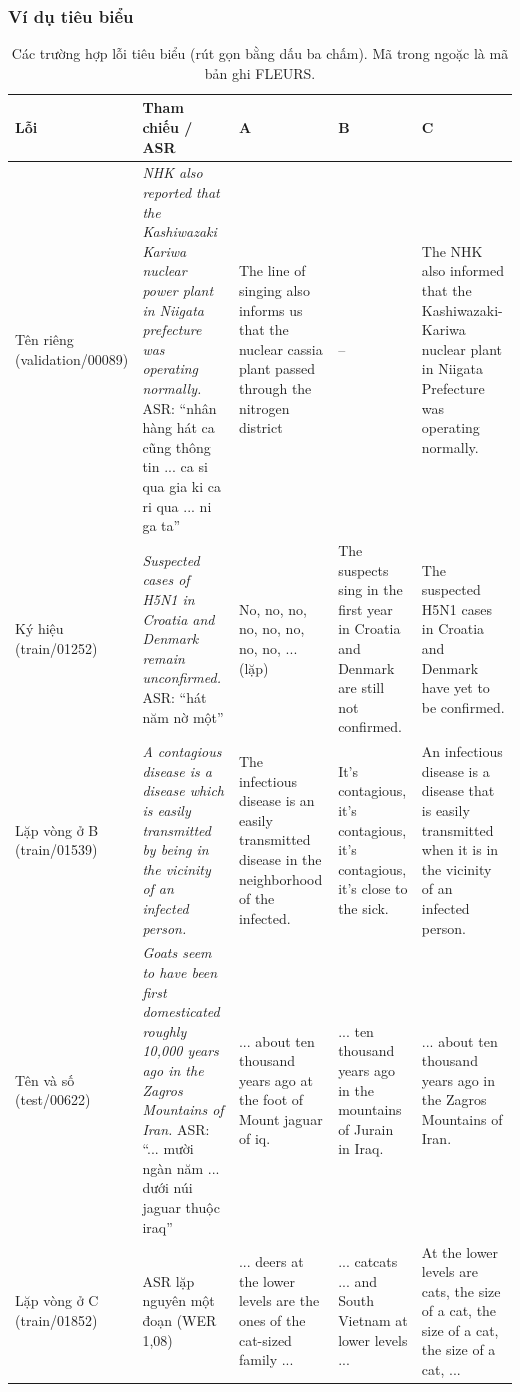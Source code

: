 \documentclass[12pt,a4paper]{article}
\begin{document}
\subsubsection{Ví dụ tiêu biểu}
\begin{table}[H]\centering\scriptsize\setlength{\tabcolsep}{3pt}
\begin{tabularx}{\textwidth}{>{\raggedright\arraybackslash}p{1.5cm}YYYY}\toprule
Lỗi & Tham chiếu / ASR & A & B & C\\\midrule
Tên riêng (validation/00089) & \emph{NHK also reported that the Kashiwazaki Kariwa nuclear power plant in Niigata prefecture was operating normally.} ASR: ``nhân hàng hát ca cũng thông tin ... ca si qua gia ki ca ri qua ... ni ga ta'' & The line of singing also informs us that the nuclear cassia plant passed through the nitrogen district & -- & The NHK also informed that the Kashiwazaki-Kariwa nuclear plant in Niigata Prefecture was operating normally.\\\midrule
Ký hiệu (train/01252) & \emph{Suspected cases of H5N1 in Croatia and Denmark remain unconfirmed.} ASR: ``hát năm nờ một'' & No, no, no, no, no, no, no, no, ... (lặp) & The suspects sing in the first year in Croatia and Denmark are still not confirmed. & The suspected H5N1 cases in Croatia and Denmark have yet to be confirmed.\\\midrule
Lặp vòng ở B (train/01539) & \emph{A contagious disease is a disease which is easily transmitted by being in the vicinity of an infected person.} & The infectious disease is an easily transmitted disease in the neighborhood of the infected. & It's contagious, it's contagious, it's contagious, it's close to the sick. & An infectious disease is a disease that is easily transmitted when it is in the vicinity of an infected person.\\\midrule
Tên và số (test/00622) & \emph{Goats seem to have been first domesticated roughly 10,000 years ago in the Zagros Mountains of Iran.} ASR: ``... mười ngàn năm ... dưới núi jaguar thuộc iraq'' & ... about ten thousand years ago at the foot of Mount jaguar of iq. & ... ten thousand years ago in the mountains of Jurain in Iraq. & ... about ten thousand years ago in the Zagros Mountains of Iran.\\\midrule
Lặp vòng ở C (train/01852) & ASR lặp nguyên một đoạn (WER 1,08) & ... deers at the lower levels are the ones of the cat-sized family ... & ... catcats ... and South Vietnam at lower levels ... & At the lower levels are cats, the size of a cat, the size of a cat, the size of a cat, ...\\
\bottomrule\end{tabularx}
\caption{Các trường hợp lỗi tiêu biểu (rút gọn bằng dấu ba chấm). Mã trong ngoặc là mã bản ghi FLEURS.}
\end{table}
\end{document}
